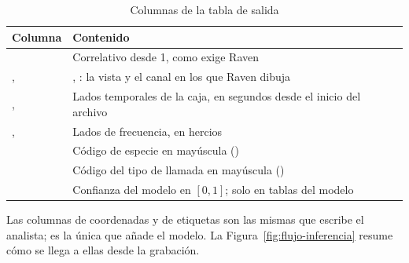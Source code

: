 \begin{table}[htbp]
    \centering
    \small
    \caption{Columnas de la tabla de salida}
    \label{tab:columnas-salida}
    \begin{tabular}{@{}lL{9.4cm}@{}}
        \toprule
        \textbf{Columna} & \textbf{Contenido} \\
        \midrule
         & Correlativo desde 1, como exige Raven \\
        ,  & , : la vista y el canal en los que Raven dibuja \\
        ,  & Lados temporales de la caja, en segundos desde el inicio del archivo \\
        ,  & Lados de frecuencia, en hercios \\
         & Código de especie en mayúscula () \\
         & Código del tipo de llamada en mayúscula () \\
         & Confianza del modelo en $[0, 1]$; solo en tablas del modelo \\
        \bottomrule
    \end{tabular}
\end{table}

Las columnas de coordenadas y de etiquetas son las mismas que escribe el analista;
 es la única que añade el modelo. La
Figura~\ref{fig:flujo-inferencia} resume cómo se llega a ellas desde la grabación.

